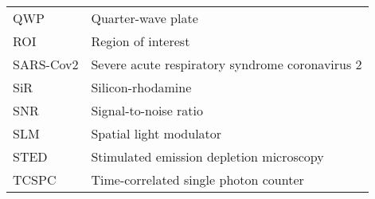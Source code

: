 \begin{tabular}{ll}
	QWP       & Quarter-wave plate                                                  \\
	ROI       & Region of interest                                                  \\
	SARS-Cov2 & Severe acute respiratory syndrome coronavirus 2                     \\
	SiR       & Silicon-rhodamine                                                   \\
	SNR       & Signal-to-noise ratio                                               \\
	SLM       & Spatial light modulator                                             \\
	STED      & Stimulated emission depletion  microscopy                           \\
	TCSPC     & Time-correlated single photon counter
\end{tabular}